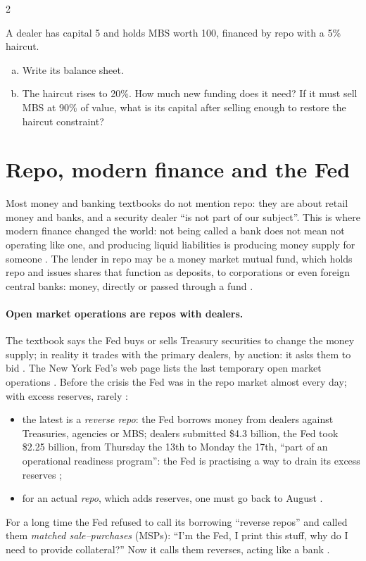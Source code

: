 \begin{paracol}{2}
\begin{exercise}
A dealer has capital 5 and holds MBS worth 100, financed by repo with a 5\% haircut.
\begin{enumerate}[(a)]
  \item Write its balance sheet.
  \item The haircut rises to 20\%. How much new funding does it need? If it must sell MBS at 90\% of value, what is its capital after selling enough to restore the
        haircut constraint?
\end{enumerate}
\end{exercise}

\section{Repo, modern finance and the Fed}\label{sec:rp-fed}

Most money and banking textbooks do not mention repo: they are about retail money and banks, and a security dealer ``is not part of our subject''. This is where
modern finance changed the world: not being called a bank does not mean not operating like one, and producing liquid liabilities is producing money supply for
someone . The lender in repo may be a money market mutual fund, which holds repo and issues shares that function as deposits, to
corporations or even foreign central banks: money, directly or passed through a fund .

\paragraph{Open market operations are repos with dealers.} The textbook says the Fed buys or sells Treasury securities to change the money supply; in reality it
trades with the primary dealers, by auction: it asks them to bid . The New York Fed's web page lists the last temporary
open market operations . Before the crisis the Fed was in the repo market almost every day; with excess reserves, rarely :
\begin{itemize}
  \item the latest is a \emph{reverse repo}: the Fed borrows money from dealers against Treasuries, agencies or MBS; dealers submitted \$4.3 billion, the Fed took
        \$2.25 billion, from Thursday the 13th to Monday the 17th, ``part of an operational readiness program'': the Fed is practising a way to drain its excess
        reserves ;
  \item for an actual \emph{repo}, which adds reserves, one must go back to August .
\end{itemize}
For a long time the Fed refused to call its borrowing ``reverse repos'' and called them \emph{matched sale--purchases} (MSPs): ``I'm the Fed, I print this stuff,
why do I need to provide collateral?'' Now it calls them reverses, acting like a bank .


\end{paracol}
